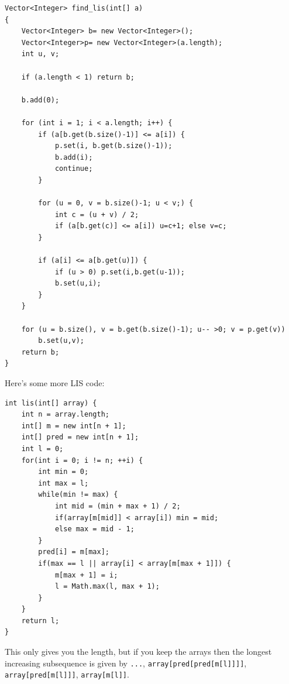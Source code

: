 \documentclass[a4paper,12pt]{article}
\begin{document}
\begin{lstlisting} 
Vector<Integer> find_lis(int[] a)
{
	Vector<Integer> b= new Vector<Integer>();
	Vector<Integer>p= new Vector<Integer>(a.length);
	int u, v;
 
	if (a.length < 1) return b;
 
	b.add(0);
 
	for (int i = 1; i < a.length; i++) {
		if (a[b.get(b.size()-1)] <= a[i]) {
			p.set(i, b.get(b.size()-1));
			b.add(i);
			continue;
		}
 
		for (u = 0, v = b.size()-1; u < v;) {
			int c = (u + v) / 2;
			if (a[b.get(c)] <= a[i]) u=c+1; else v=c;
		}
 
		if (a[i] <= a[b.get(u)]) {
			if (u > 0) p.set(i,b.get(u-1));
			b.set(u,i);
		}	
	}
 
	for (u = b.size(), v = b.get(b.size()-1); u-- >0; v = p.get(v))
		b.set(u,v);
	return b;
}
\end{lstlisting}

\noindent Here's some more LIS code:
\begin{lstlisting}
int lis(int[] array) {
	int n = array.length;
	int[] m = new int[n + 1];
	int[] pred = new int[n + 1];
	int l = 0;
	for(int i = 0; i != n; ++i) {
		int min = 0;
		int max = l;
		while(min != max) {
			int mid = (min + max + 1) / 2;
			if(array[m[mid]] < array[i]) min = mid;
			else max = mid - 1;
		}
		pred[i] = m[max];
		if(max == l || array[i] < array[m[max + 1]]) {
			m[max + 1] = i;
			l = Math.max(l, max + 1);
		}
	}
	return l;
}
\end{lstlisting}

This only gives you the length, but if you keep the arrays then the longest increasing subsequence is given by \verb/.../, \verb/array[pred[pred[m[l]]]]/, \verb/array[pred[m[l]]]/, \verb/array[m[l]]/.
\end{document}
